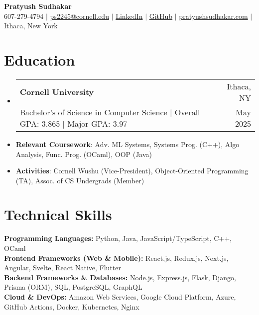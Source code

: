 \documentclass[letterpaper,11pt]{article}
\makeatletter
\newcommand{\resumeItem}[1]{
  \item\small{
    {#1 \vspace{-2.5pt}}
  }
}
\newcommand{\education}[4]{
  \vspace{-3pt}\item
    \begin{tabular*}{0.97\textwidth}[t]{@{}l@{\extracolsep{\fill}}r@{}}
      \textbf{#1} & #2 \\
      \small#3 & \small #4 \\
    \end{tabular*}\vspace{-6pt}
}
\newcommand{\resumeSubHeadingListStart}{\begin{itemize}[leftmargin=0.15in, label={}]}
\newcommand{\resumeSubHeadingListEnd}{\end{itemize}}
\makeatother
\begin{document}

\begin{center}
  \vspace*{-1cm}
  \textbf{\huge  Pratyush Sudhakar} \\ \vspace{1pt}
   607-279-4794 $|$ \href{mailto:ps2245@cornell.edu}{ps2245@cornell.edu} $|$
  \href{https://linkedin.com/in/pratyushsudhakar}{LinkedIn} $|$
  \href{https://github.com/pratyush1712}{GitHub} $|$
  \href{https://pratyushsudhakar.com/}{pratyushsudhakar.com}
  $|$
  {Ithaca, New York}
\end{center}


\section{Education}
\resumeSubHeadingListStart
\education
{Cornell University}{Ithaca, NY}
{Bachelor's of Science in Computer Science $|$ Overall GPA: 3.865 $|$ Major GPA: 3.97}{May 2025}
\resumeItem{\textbf{Relevant Coursework}: Adv. ML Systems, Systems Prog. (C++), Algo Analysis, Func. Prog. (OCaml), OOP (Java)}
\vspace{-14.7pt}
\resumeItem{\textbf{Activities}: Cornell Wushu (Vice-President), Object-Oriented Programming (TA), Assoc. of CS Undergrads (Member)}
\resumeSubHeadingListEnd

\section{Technical Skills}
\begin{itemize}[leftmargin=0.15in, label={}]
\small{\item{
    \textbf{Programming Languages:} Python, Java, JavaScript/TypeScript, C++, OCaml \\
    \vspace{2pt}
    \textbf{Frontend Frameworks (Web \& Mobile):} React.js, Redux.js, Next.js, Angular, Svelte, React Native, Flutter \\
    \vspace{2pt}
    \textbf{Backend Frameworks \& Databases:} Node.js, Express.js, Flask, Django, Prisma (ORM), SQL, PostgreSQL, GraphQL \\
    \vspace{2pt}
    \textbf{Cloud \& DevOps:} Amazon Web Services, Google Cloud Platform, Azure, GitHub Actions, Docker, Kubernetes, Nginx
}}
\end{itemize}
\end{document}
